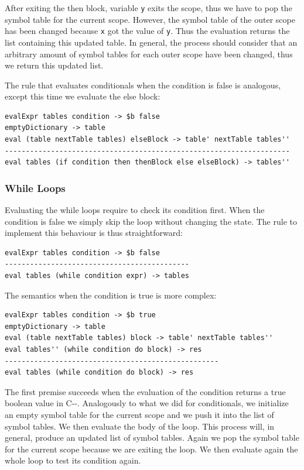 \noindent
After exiting the then block, variable \texttt{y} exits the scope, thus we have to pop the symbol table for the current scope. However, the symbol table of the outer scope has been changed because \texttt{x} got the value of \texttt{y}. Thus the evaluation returns the list containing this updated table. In general, the process should consider that an arbitrary amount of symbol tables for each outer scope have been changed, thus we return this updated list.

The rule that evaluates conditionals when the condition is false is analogous, except this time we evaluate the else block:

\begin{lstlisting}
evalExpr tables condition -> $b false
emptyDictionary -> table
eval (table nextTable tables) elseBlock -> table' nextTable tables''
--------------------------------------------------------------------
eval tables (if condition then thenBlock else elseBlock) -> tables''
\end{lstlisting}

\subsubsection{While Loops}
Evaluating the while loops require to check its condition first. When the condition is false we simply skip the loop without changing the state. The rule to implement this behaviour is thus straightforward:

\begin{lstlisting}
evalExpr tables condition -> $b false
--------------------------------------------
eval tables (while condition expr) -> tables
\end{lstlisting}

\noindent
The semantics when the condition is true is more complex:

\begin{lstlisting}
evalExpr tables condition -> $b true
emptyDictionary -> table
eval (table nextTable tables) block -> table' nextTable tables''
eval tables'' (while condition do block) -> res
---------------------------------------------------
eval tables (while condition do block) -> res
\end{lstlisting}

\noindent
The first premise succeeds when the evaluation of the condition returns a true boolean value in C-{}-. Analogously to what we did for conditionals, we initialize an empty symbol table for the current scope and we push it into the list of symbol tables. We then evaluate the body of the loop. This process will, in general, produce an updated list of symbol tables. Again we pop the symbol table for the current scope because we are exiting the loop. We then evaluate again the whole loop to test its condition again.


